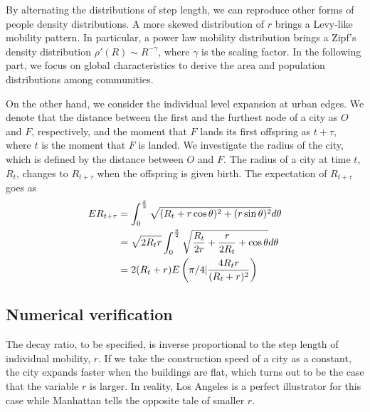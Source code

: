 \documentclass[aps,prl]{revtex4-1}
\begin{document}
By alternating the distributions of step length, we can reproduce other forms of people density distributions. A more skewed distribution of $r$ brings a Levy-like mobility pattern. In particular, a power law mobility distribution brings a Zipf's density distribution $\rho '(R)\sim R^{-\gamma}$\cite{PhysRevX.4.011008}, where $\gamma$ is the scaling factor.  In the following part, we focus on global characteristics to derive the area and population distributions among communities.

On the other hand, we consider the individual level expansion at urban edges. We denote that the distance between the first and the furthest node of a city as $O$ and $F$, respectively, and the moment that $F$ lands its first offspring as $t+\tau$, where $t$ is the moment that $F$ is landed. We investigate the radius of the city, which is defined by the distance between $O$ and $F$. The radius of a city at time $t$, $R_t$, changes to $R_{t+\tau}$ when the offspring is given birth. The expectation of $R_{t+\tau}$ goes as 
\begin{align}
	E R_{t+\tau} &= \int_0^{\frac{\pi}{2}} \sqrt{(R_t+r\cos\theta)^2+(r\sin\theta)^2} d\theta \notag \\
	&= \sqrt{2 R_t r} \int_{0}^{\frac{\pi}{2}} \sqrt{\frac{R_{t}}{2 r}+\frac{r}{2 R_{t}}+\cos \theta} d \theta \notag\\
	&= 2(R_t+r) E\left(\pi/4| \frac{4R_t r}{(R_t+r)^2}\right)
\end{align}

\subsection{Numerical verification}

The decay ratio, to be specified, is inverse proportional to the step length of individual mobility, $r$. If we take the construction speed of a city as a constant, the city expands faster when the buildings are flat, which turns out to be the case that the variable $r$ is larger. In reality, Los Angeles is a perfect illustrator for this case while Manhattan tells the opposite tale of smaller $r$.
\end{document}
